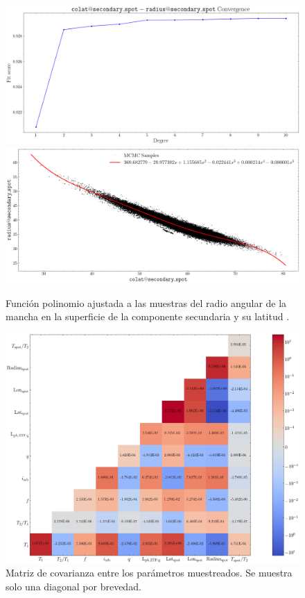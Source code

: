 \begin{figure}[!ht]
    \centering
    \includegraphics[scale=0.44]{Apendice/Figures/Figura radius@secondary_spot-colat@secondary_spot Correlacion Convergencia.png}
    \includegraphics[scale=0.44]{Apendice/Figures/Figura radius@secondary_spot-colat@secondary_spot Correlacion.png}
    \caption{Función polinomio ajustada a las muestras del radio angular de la
    mancha en la superficie de la componente secundaria
     y su latitud .}
\end{figure}

\begin{figure}[!ht]
    \centering
    \includegraphics[width=1\linewidth]{Apendice/Figures/Figura ZTF MCMC Covarianzas.png}
    \caption{Matriz de covarianza entre los parámetros muestreados. Se muestra
    solo una diagonal por brevedad.}
    \label{figuraMcmcCovarianzas}
\end{figure}